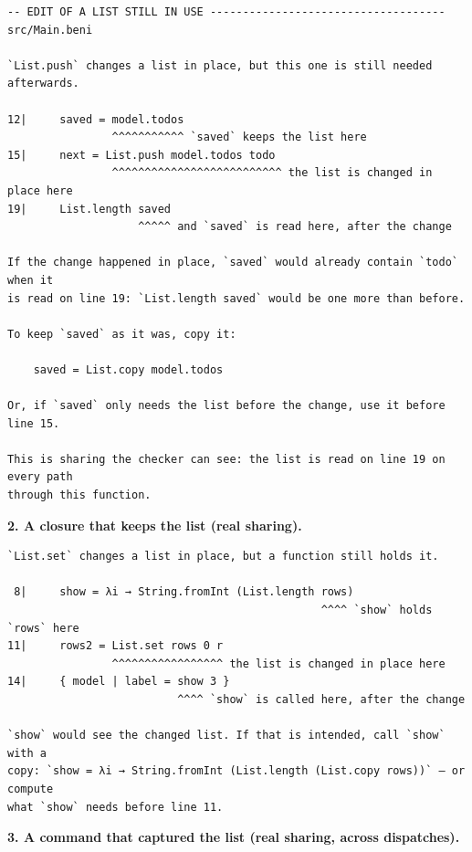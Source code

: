 \begin{Verbatim}
-- EDIT OF A LIST STILL IN USE ------------------------------------ src/Main.beni

`List.push` changes a list in place, but this one is still needed afterwards.

12|     saved = model.todos
                ^^^^^^^^^^^ `saved` keeps the list here
15|     next = List.push model.todos todo
                ^^^^^^^^^^^^^^^^^^^^^^^^^^ the list is changed in place here
19|     List.length saved
                    ^^^^^ and `saved` is read here, after the change

If the change happened in place, `saved` would already contain `todo` when it
is read on line 19: `List.length saved` would be one more than before.

To keep `saved` as it was, copy it:

    saved = List.copy model.todos

Or, if `saved` only needs the list before the change, use it before line 15.

This is sharing the checker can see: the list is read on line 19 on every path
through this function.
\end{Verbatim}

\textbf{2. A closure that keeps the list (real sharing).}

\begin{Verbatim}
`List.set` changes a list in place, but a function still holds it.

 8|     show = λi → String.fromInt (List.length rows)
                                                ^^^^ `show` holds `rows` here
11|     rows2 = List.set rows 0 r
                ^^^^^^^^^^^^^^^^^ the list is changed in place here
14|     { model | label = show 3 }
                          ^^^^ `show` is called here, after the change

`show` would see the changed list. If that is intended, call `show` with a
copy: `show = λi → String.fromInt (List.length (List.copy rows))` — or compute
what `show` needs before line 11.
\end{Verbatim}

\textbf{3. A command that captured the list (real sharing, across dispatches).}

